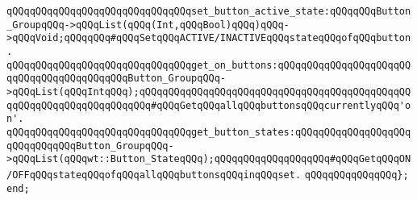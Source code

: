 \newline
\verb|qQQqqQQqqQQqqQQqqQQqqQQqqQQqqQQqset_button_active_state:qQQqqQQqButton_GroupqQQq->qQQqList(qQQq(Int,qQQqBool)qQQq)qQQq->qQQqVoid;qQQqqQQq#qQQqSetqQQqACTIVE/INACTIVEqQQqstateqQQqofqQQqbutton.|\newline
\verb|qQQqqQQqqQQqqQQqqQQqqQQqqQQqqQQqget_on_buttons:qQQqqQQqqQQqqQQqqQQqqQQqqQQqqQQqqQQqqQQqqQQqButton_GroupqQQq->qQQqList(qQQqIntqQQq);qQQqqQQqqQQqqQQqqQQqqQQqqQQqqQQqqQQqqQQqqQQqqQQqqQQqqQQqqQQqqQQqqQQqqQQq#qQQqGetqQQqallqQQqbuttonsqQQqcurrentlyqQQq'on'.|\newline
\verb|qQQqqQQqqQQqqQQqqQQqqQQqqQQqqQQqget_button_states:qQQqqQQqqQQqqQQqqQQqqQQqqQQqqQQqButton_GroupqQQq->qQQqList(qQQqwt::Button_StateqQQq);qQQqqQQqqQQqqQQqqQQq#qQQqGetqQQqON/OFFqQQqstateqQQqofqQQqallqQQqbuttonsqQQqinqQQqset.|\newline
\verb|qQQqqQQqqQQqqQQq};|\newline
\newline
\verb|end;|\newline

